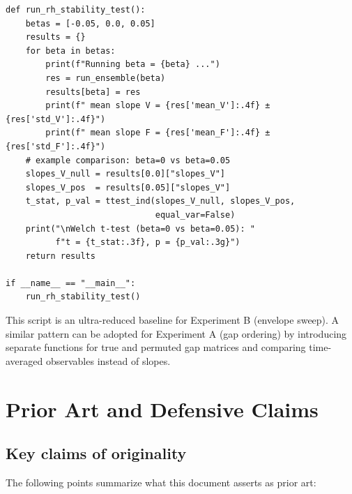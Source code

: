 \documentclass[11pt]{article}
\begin{document}
\begin{verbatim}
def run_rh_stability_test():
    betas = [-0.05, 0.0, 0.05]
    results = {}
    for beta in betas:
        print(f"Running beta = {beta} ...")
        res = run_ensemble(beta)
        results[beta] = res
        print(f" mean slope V = {res['mean_V']:.4f} ± {res['std_V']:.4f}")
        print(f" mean slope F = {res['mean_F']:.4f} ± {res['std_F']:.4f}")
    # example comparison: beta=0 vs beta=0.05
    slopes_V_null = results[0.0]["slopes_V"]
    slopes_V_pos  = results[0.05]["slopes_V"]
    t_stat, p_val = ttest_ind(slopes_V_null, slopes_V_pos,
                              equal_var=False)
    print("\nWelch t-test (beta=0 vs beta=0.05): "
          f"t = {t_stat:.3f}, p = {p_val:.3g}")
    return results

if __name__ == "__main__":
    run_rh_stability_test()
\end{verbatim}

This script is an ultra-reduced baseline for Experiment B (envelope sweep). A similar pattern can be adopted for Experiment A (gap ordering) by introducing separate functions for true and permuted gap matrices and comparing time-averaged observables instead of slopes.

\section{Prior Art and Defensive Claims}

\subsection{Key claims of originality}

The following points summarize what this document asserts as prior art:
\end{document}
